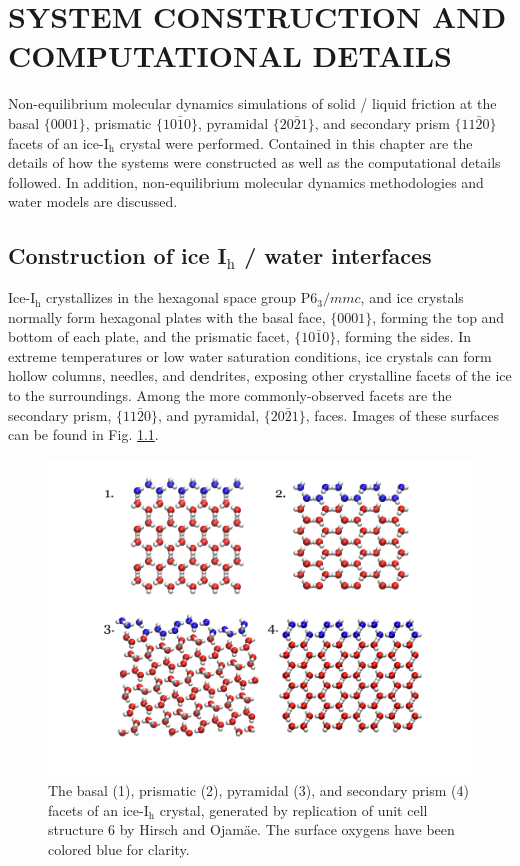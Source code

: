 \newcommand*{\citen}[1]{%
  \begingroup
    \romannumeral-`\x %
    \setcitestyle{numbers}%
    \cite{#1}%
  \endgroup   
}

\chapter{SYSTEM CONSTRUCTION AND COMPUTATIONAL DETAILS}

Non-equilibrium molecular dynamics simulations of solid / liquid
friction at the basal $\{0001\}$, prismatic $\{10\bar{1}0\}$,
pyramidal $\{20\bar{2}1\}$, and secondary prism $\{11\bar{2}0\}$
facets of an ice-I$_\mathrm{h}$ crystal were performed. Contained in
this chapter are the details of how the systems were constructed as
well as the computational details followed. In addition,
non-equilibrium molecular dynamics methodologies and water models are
discussed.


\section{Construction of ice I$_\mathrm{h}$ / water interfaces}

Ice-I$_\mathrm{h}$ crystallizes in the hexagonal space group
P$6_3/mmc$, and ice crystals normally form hexagonal plates with the
basal face, $\{0001\}$, forming the top and bottom of each plate, and
the prismatic facet, $\{10\bar{1}0\}$, forming the sides.  In extreme
temperatures or low water saturation conditions, ice crystals can form
hollow columns, needles, and dendrites, exposing other crystalline
facets of the ice to the surroundings.  Among the more
commonly-observed facets are the secondary prism, $\{11\bar{2}0\}$,
and pyramidal, $\{20\bar{2}1\}$, faces. Images of these surfaces can
be found in Fig. \ref{fig:surfMorph}.


\begin{figure}
\includegraphics[width=\linewidth]{Figures/surfMorph}
\caption{\label{fig:surfMorph}The basal (1), prismatic (2), pyramidal
  (3), and secondary prism (4) facets of an ice-I$_\mathrm{h}$
  crystal, generated by replication of unit cell structure 6 by Hirsch
  and Ojam\"{a}e. The surface oxygens have been colored blue for clarity.}
\end{figure}

